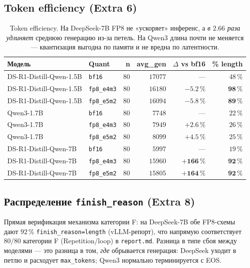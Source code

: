 \documentclass[11pt, a4paper]{article}
\newcommand{\code}[1]{\texttt{#1}}
\begin{document}
\subsection{Token efficiency (Extra 6)}

\begin{table}[H]
\centering
\small
\begin{tabular}{llrrrr}
\toprule
\textbf{Модель} & \textbf{Quant} & \textbf{n} & \textbf{avg\_gen} & \textbf{$\Delta$ vs bf16} & \textbf{\% length} \\
\midrule
DS-R1-Distill-Qwen-1.5B & \code{bf16}      & $80$ & $17077$ & ---     & $48\,\%$ \\
DS-R1-Distill-Qwen-1.5B & \code{fp8\_e4m3} & $80$ & $16180$ & $-5.2\,\%$ & $\mathbf{98\,\%}$ \\
DS-R1-Distill-Qwen-1.5B & \code{fp8\_e5m2} & $80$ & $16094$ & $-5.8\,\%$ & $\mathbf{89\,\%}$ \\
Qwen3-1.7B              & \code{bf16}      & $80$ & $7748$  & ---     & $22\,\%$ \\
Qwen3-1.7B              & \code{fp8\_e4m3} & $80$ & $7949$  & $+2.6\,\%$ & $26\,\%$ \\
Qwen3-1.7B              & \code{fp8\_e5m2} & $80$ & $8099$  & $+4.5\,\%$ & $25\,\%$ \\
DS-R1-Distill-Qwen-7B   & \code{bf16}      & $80$ & $5997$  & ---     & $19\,\%$ \\
DS-R1-Distill-Qwen-7B   & \code{fp8\_e4m3} & $80$ & $15960$ & $\mathbf{+166\,\%}$ & $\mathbf{92\,\%}$ \\
DS-R1-Distill-Qwen-7B   & \code{fp8\_e5m2} & $80$ & $15805$ & $\mathbf{+164\,\%}$ & $\mathbf{92\,\%}$ \\
\bottomrule
\end{tabular}
\caption{Token efficiency. На DeepSeek-7B FP8 не «ускоряет» инференс,
а \emph{в $2.66$ раза удлиняет} среднюю генерацию из-за петель. На
Qwen3 длина почти не меняется — квантизация выгодна по памяти и не
вредна по латентности.}
\label{tab:token-efficiency}
\end{table}

\subsection{Распределение \code{finish\_reason} (Extra 8)}

Прямая верификация механизма категории F: на DeepSeek-7B обе FP8-схемы
дают $92\,\%$ \code{finish\_reason=length} (vLLM-репорт), что напрямую
соответствует $80/80$ категории F (Repetition/loop) в
\code{report.md}. Разница в типе сбоя между моделями — это разница в
том, \emph{где} обрывается генерация: DeepSeek уходит в петлю и
расходует \code{max\_tokens}; Qwen3 нормально терминируется с EOS.
\end{document}
